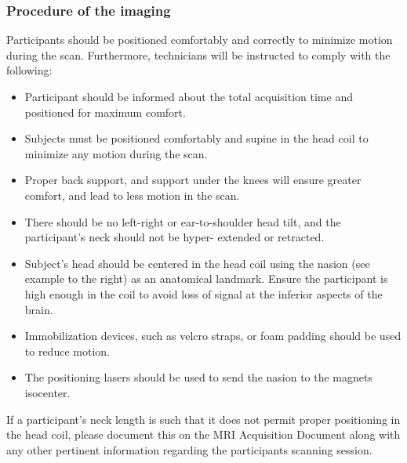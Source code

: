\subsubsection{Procedure of the imaging}
Participants should be positioned comfortably and correctly to minimize motion during the scan. Furthermore, technicians will be instructed to comply with the following:
\begin{itemize}
\item Participant should be informed about the total acquisition time and positioned for maximum comfort.
\item Subjects must be positioned comfortably and supine in the head coil to minimize any motion during the scan.
\item Proper back support, and support under the knees will ensure greater comfort, and lead to less motion in the scan.
\item There should be no left-right or ear-to-shoulder head tilt, and the participant’s neck should not be hyper- extended or retracted.
\item Subject's head should be centered in the head coil using the nasion (see example to the right) as an anatomical landmark. Ensure the participant is high enough in the coil to avoid loss of signal at the inferior aspects of the brain.
\item Immobilization devices, such as velcro straps, or foam padding should be used to reduce motion.
\item The positioning lasers should be used to send the nasion to the magnets isocenter.
\end{itemize}
If a participant’s neck length is such that it does not permit proper positioning in the head coil, please document this on the \ac{MRI} Acquisition Document along with any other pertinent information regarding the participants scanning session.

